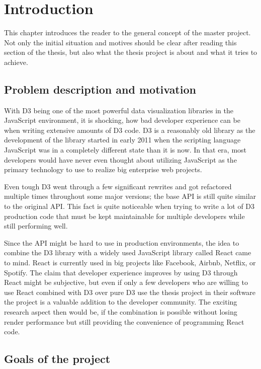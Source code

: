 \chapter{Introduction}
\label{cha:Introduction}

This chapter introduces the reader to the general concept of the master project. Not only the initial situation and motives should be clear after reading this section of the thesis, but also what the thesis project is about and what it tries to achieve.

\section{Problem description and motivation}

With D3 being one of the most powerful data visualization libraries in the JavaScript environment, it is shocking, how bad developer experience can be when writing extensive amounts of D3 code. D3 is a reasonably old library as the development of the library started in early 2011 when the scripting language JavaScript was in a completely different state than it is now. In that era, most developers would have never even thought about utilizing JavaScript as the primary technology to use to realize big enterprise web projects. 

Even tough D3 went through a few significant rewrites and got refactored multiple times throughout some major versions; the base API is still quite similar to the original API. This fact is quite noticeable when trying to write a lot of D3 production code that must be kept maintainable for multiple developers while still performing well.

Since the API might be hard to use in production environments, the idea to combine the D3 library with a widely used JavaScript library called React came to mind. React is currently used in big projects like Facebook, Airbnb, Netflix, or Spotify. The claim that developer experience improves by using D3 through React might be subjective, but even if only a few developers who are willing to use React combined with D3 over pure D3 use the thesis project in their software the project is a valuable addition to the developer community. The exciting research aspect then would be, if the combination is possible without losing render performance but still providing the convenience of programming React code.

\section{Goals of the project}


